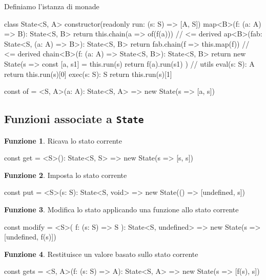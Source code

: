 \documentclass[12pt]{article}
\theoremstyle{definition}
\newtheorem{function}{Funzione}[section]
\newenvironment{code}
  {\vspace{0.5cm} \VerbatimEnvironment\begin{typescriptcode}}
  {\end{typescriptcode} \vspace{0.2cm}}
\begin{document}
Definiamo l'istanza di monade

\begin{code}
class State<S, A> {
  constructor(readonly run: (s: S) => [A, S]) {}
  map<B>(f: (a: A) => B): State<S, B> {
    return this.chain(a => of(f(a))) // <= derived
  }
  ap<B>(fab: State<S, (a: A) => B>): State<S, B> {
    return fab.chain(f => this.map(f)) // <= derived
  }
  chain<B>(f: (a: A) => State<S, B>): State<S, B> {
    return new State(s => {
      const [a, s1] = this.run(s)
      return f(a).run(s1)
    })
  }
  // utils
  eval(s: S): A {
    return this.run(s)[0]
  }
  exec(s: S): S {
    return this.run(s)[1]
  }
}

const of = <S, A>(a: A): State<S, A> =>
  new State(s => [a, s])
\end{code}

\subsection{Funzioni associate a \texttt{State}}

\begin{function}
Ricava lo stato corrente

\begin{code}
const get = <S>(): State<S, S> =>
  new State(s => [s, s])
\end{code}
\end{function}

\begin{function}
Imposta lo stato corrente

\begin{code}
const put = <S>(s: S): State<S, void> =>
  new State(() => [undefined, s])
\end{code}
\end{function}

\begin{function}
Modifica lo stato applicando una funzione allo stato corrente

\begin{code}
const modify = <S>(
  f: (s: S) => S
): State<S, undefined> => new State(s => [undefined, f(s)])
\end{code}
\end{function}

\begin{function}
Restituisce un valore basato sullo stato corrente

\begin{code}
const gets = <S, A>(f: (s: S) => A): State<S, A> =>
  new State(s => [f(s), s])
\end{code}
\end{function}
\end{document}

